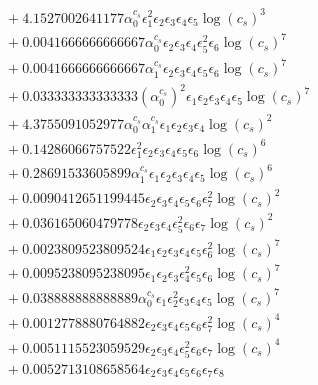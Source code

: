 \documentclass[10pt]{article}
\begin{document}
\begin{align*}
&{}  + 4.1527002641177 \alpha_{0}^{c_s} \epsilon_{1}^{2} \epsilon_{2} \epsilon_{3} \epsilon_{4} \epsilon_{5} \log{\left(c_{s} \right)}^{3} \\
&{}  + 0.0041666666666667 \alpha_{0}^{c_s} \epsilon_{2} \epsilon_{3} \epsilon_{4} \epsilon_{5}^{2} \epsilon_{6} \log{\left(c_{s} \right)}^{7} \\
&{}  + 0.0041666666666667 \alpha_{1}^{c_s} \epsilon_{2} \epsilon_{3} \epsilon_{4} \epsilon_{5} \epsilon_{6} \log{\left(c_{s} \right)}^{7} \\
&{}  + 0.033333333333333 \left(\alpha_{0}^{c_s}\right)^{2} \epsilon_{1} \epsilon_{2} \epsilon_{3} \epsilon_{4} \epsilon_{5} \log{\left(c_{s} \right)}^{7} \\
&{}  + 4.3755091052977 \alpha_{0}^{c_s} \alpha_{1}^{c_s} \epsilon_{1} \epsilon_{2} \epsilon_{3} \epsilon_{4} \log{\left(c_{s} \right)}^{2} \\
&{}  + 0.14286066757522 \epsilon_{1}^{2} \epsilon_{2} \epsilon_{3} \epsilon_{4} \epsilon_{5} \epsilon_{6} \log{\left(c_{s} \right)}^{6} \\
&{}  + 0.28691533605899 \alpha_{1}^{c_s} \epsilon_{1} \epsilon_{2} \epsilon_{3} \epsilon_{4} \epsilon_{5} \log{\left(c_{s} \right)}^{6} \\
&{}  + 0.0090412651199445 \epsilon_{2} \epsilon_{3} \epsilon_{4} \epsilon_{5} \epsilon_{6} \epsilon_{7}^{2} \log{\left(c_{s} \right)}^{2} \\
&{}  + 0.036165060479778 \epsilon_{2} \epsilon_{3} \epsilon_{4} \epsilon_{5}^{2} \epsilon_{6} \epsilon_{7} \log{\left(c_{s} \right)}^{2} \\
&{}  + 0.0023809523809524 \epsilon_{1} \epsilon_{2} \epsilon_{3} \epsilon_{4} \epsilon_{5} \epsilon_{6}^{2} \log{\left(c_{s} \right)}^{7} \\
&{}  + 0.0095238095238095 \epsilon_{1} \epsilon_{2} \epsilon_{3} \epsilon_{4}^{2} \epsilon_{5} \epsilon_{6} \log{\left(c_{s} \right)}^{7} \\
&{}  + 0.038888888888889 \alpha_{0}^{c_s} \epsilon_{1} \epsilon_{2}^{2} \epsilon_{3} \epsilon_{4} \epsilon_{5} \log{\left(c_{s} \right)}^{7} \\
&{}  + 0.0012778880764882 \epsilon_{2} \epsilon_{3} \epsilon_{4} \epsilon_{5} \epsilon_{6} \epsilon_{7}^{2} \log{\left(c_{s} \right)}^{4} \\
&{}  + 0.0051115523059529 \epsilon_{2} \epsilon_{3} \epsilon_{4} \epsilon_{5}^{2} \epsilon_{6} \epsilon_{7} \log{\left(c_{s} \right)}^{4} \\
&{}  + 0.0052713108658564 \epsilon_{2} \epsilon_{3} \epsilon_{4} \epsilon_{5} \epsilon_{6} \epsilon_{7} \epsilon_{8} \\

\end{align*}
\end{document}

